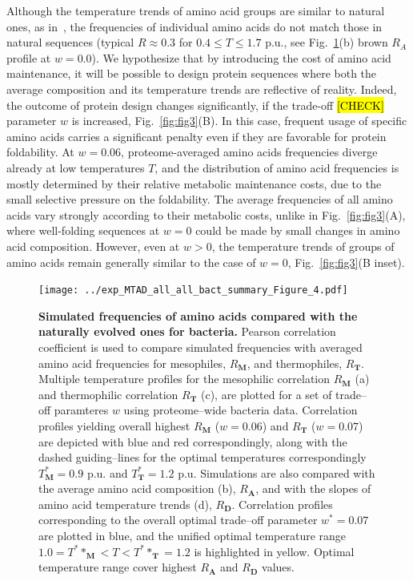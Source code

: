 \documentclass[10pt,letterpaper]{article}
\begin{document}
Although the temperature trends of amino acid groups are similar to natural ones, as in~\cite{Berezovsky2007Positive}, the frequencies of individual amino acids do not match those in natural sequences (typical $R\approx0.3$ for $0.4\leq T\leq 1.7$ p.u., see Fig.~\ref{fig:fig4}(b) brown  $R_A$ profile at $w=0.0$).  We hypothesize that by introducing the cost of amino acid maintenance, it will be possible to design protein sequences where both the average composition and its temperature trends are reflective of reality. Indeed, the outcome of protein design changes significantly, if the  trade-off \hl{[CHECK]} parameter $\mathit{w}$ is increased, Fig.~\ref{fig:fig3}(B). In this case, frequent usage of specific amino acids carries a significant penalty even if they are favorable for protein foldability.
At $\mathit{w}=0.06$, proteome-averaged amino acids frequencies diverge already at low temperatures $T$, 
and the distribution of amino acid frequencies is mostly determined by their relative metabolic maintenance costs, due to the small selective pressure on the foldability. The average frequencies of all amino acids vary strongly according to their metabolic costs, unlike in Fig.~\ref{fig:fig3}(A), where well-folding sequences at $w=0$ could be made by small changes in amino acid composition. However, even at $w>0$, the temperature trends of groups of amino acids remain generally similar to the case of $w=0$, Fig.~\ref{fig:fig3}(B inset).


\begin{figure}[h!]
\texttt{[image: ../exp\_MTAD\_all\_all\_bact\_summary\_Figure\_4.pdf]}
\caption{
{\bf Simulated frequencies of amino acids compared with the naturally evolved ones for bacteria.} Pearson correlation coefficient is used to compare simulated frequencies with averaged amino acid frequencies for mesophiles, $R_{\mathbf{M}}$, and thermophiles, $R_{\mathbf{T}}$. Multiple temperature profiles for the mesophilic correlation $R_{\mathbf{M}}$ (a) and thermophilic correlation $R_{\mathbf{T}}$ (c), are plotted for a set of trade--off paramteres $w$ using proteome--wide bacteria data. Correlation profiles yielding overall highest $R_{\mathbf{M}}$ ($w=0.06$) and $R_{\mathbf{T}}$ ($w=0.07$) are depicted with blue and red correspondingly, along with the dashed guiding--lines for the optimal temperatures correspondingly $T^*_{\mathbf{M}}=0.9$ p.u.  and $T^*_{\mathbf{T}}=1.2$ p.u. Simulations are also compared with the average amino acid composition (b), $R_{\mathbf{A}}$, and with the slopes of amino acid temperature trends (d), $R_{\mathbf{D}}$. Correlation profiles corresponding to the overall optimal trade--off parameter $w^*=0.07$ are plotted in blue, and the unified optimal temperature range $1.0=T^**_{\mathbf{M}}<T<T^**_{\mathbf{T}}=1.2$ is highlighted in yellow. Optimal temperature range cover highest $R_{\mathbf{A}}$ and $R_{\mathbf{D}}$ values.
}
\label{fig:fig4}
\end{figure}
\end{document}

